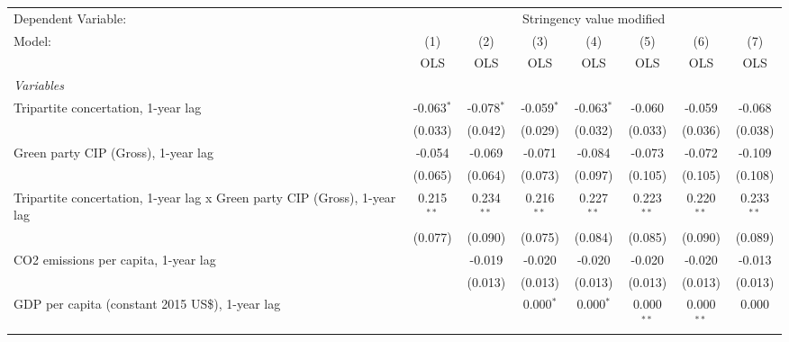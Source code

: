 
\begingroup
\centering
\begin{tabular}{lccccccc}
   \toprule
   Dependent Variable: & \multicolumn{7}{c}{Stringency value modified}\\
   Model:                                                                    & (1)          & (2)          & (3)          & (4)          & (5)          & (6)          & (7)\\  
                                                                             &  OLS         & OLS          & OLS          & OLS          & OLS          & OLS          & OLS\\  
   \midrule
   \emph{Variables}\\
   Tripartite concertation, 1-year lag                                       & -0.063$^{*}$ & -0.078$^{*}$ & -0.059$^{*}$ & -0.063$^{*}$ & -0.060       & -0.059       & -0.068\\   
                                                                             & (0.033)      & (0.042)      & (0.029)      & (0.032)      & (0.033)      & (0.036)      & (0.038)\\   
   Green party CIP (Gross), 1-year lag                                       & -0.054       & -0.069       & -0.071       & -0.084       & -0.073       & -0.072       & -0.109\\   
                                                                             & (0.065)      & (0.064)      & (0.073)      & (0.097)      & (0.105)      & (0.105)      & (0.108)\\   
   Tripartite concertation, 1-year lag x Green party CIP (Gross), 1-year lag & 0.215$^{**}$ & 0.234$^{**}$ & 0.216$^{**}$ & 0.227$^{**}$ & 0.223$^{**}$ & 0.220$^{**}$ & 0.233$^{**}$\\   
                                                                             & (0.077)      & (0.090)      & (0.075)      & (0.084)      & (0.085)      & (0.090)      & (0.089)\\   
   CO2 emissions per capita, 1-year lag                                      &              & -0.019       & -0.020       & -0.020       & -0.020       & -0.020       & -0.013\\   
                                                                             &              & (0.013)      & (0.013)      & (0.013)      & (0.013)      & (0.013)      & (0.013)\\   
   GDP per capita (constant 2015 US\$), 1-year lag                           &              &              & 0.000$^{*}$  & 0.000$^{*}$  & 0.000$^{**}$ & 0.000$^{**}$ & 0.000\\   

\end{tabular}
